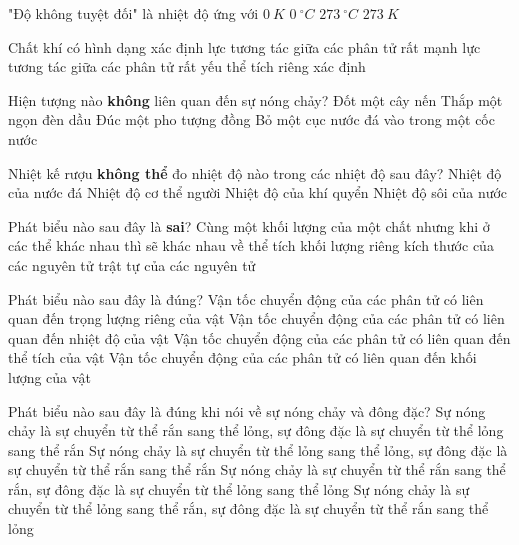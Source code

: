 \begin{ex}
	"Độ không tuyệt đối" là nhiệt độ ứng với
	\choice
	{\True $0\ K$}
	{$0\ ^\circ C$}
	{$273\ ^\circ C$}
	{$273\ K$}
	
	\loigiai{}
\end{ex}

\begin{ex}
 Chất khí có
	\choice
	{hình dạng xác định}
	{lực tương tác giữa các phân tử rất mạnh}
	{\True lực tương tác giữa các phân tử rất yếu}
	{thể tích riêng xác định}
	\loigiai{}
\end{ex}

\begin{ex}
Hiện tượng nào \textbf{không} liên quan đến sự nóng chảy?
\choice
{Đốt một cây nến}
{\True Thắp một ngọn đèn dầu}
{Đúc một pho tượng đồng}
{Bỏ một cục nước đá vào trong một cốc nước}	
	\loigiai{}
\end{ex}

\begin{ex}
Nhiệt kế rượu \textbf{không thể} đo nhiệt độ nào trong các nhiệt độ sau đây?
\choice
{Nhiệt độ của nước đá}
{Nhiệt độ cơ thể người}
{Nhiệt độ của khí quyển}
{\True Nhiệt độ sôi của nước}	
	\loigiai{}
\end{ex}

\begin{ex}
	Phát biểu nào sau đây là \textbf{sai}? Cùng một khối lượng của một chất nhưng khi ở các thể khác nhau thì sẽ khác nhau về
	\choice
	{thể tích}
	{khối lượng riêng}
	{\True kích thước của các nguyên tử}
	{trật tự của các nguyên tử}
	\loigiai{}
\end{ex}

\begin{ex}
	Phát biểu nào sau đây là đúng?
\choice
{Vận tốc chuyển động của các phân tử có liên quan đến trọng lượng riêng của vật}
{\True Vận tốc chuyển động của các phân tử có liên quan đến nhiệt độ của vật}
{Vận tốc chuyển động của các phân tử có liên quan đến thể tích của vật}
{Vận tốc chuyển động của các phân tử có liên quan đến khối lượng của vật}	
	\loigiai{}
\end{ex}

\begin{ex}
	Phát biểu nào sau đây là đúng khi nói về sự nóng chảy và đông đặc?
	\choice
	{\True Sự nóng chảy là sự chuyển từ thể rắn sang thể lỏng, sự đông đặc là sự chuyển từ thể lỏng sang thể rắn}
	{Sự nóng chảy là sự chuyển từ thể lỏng sang thể lỏng, sự đông đặc là sự chuyển từ thể rắn sang thể rắn}
	{Sự nóng chảy là sự chuyển từ thể rắn sang thể rắn, sự đông đặc là sự chuyển từ thể lỏng sang thể lỏng}
	{Sự nóng chảy là sự chuyển từ thể lỏng sang thể rắn, sự đông đặc là sự chuyển từ thể rắn sang thể lỏng}
	\loigiai{}
\end{ex}

